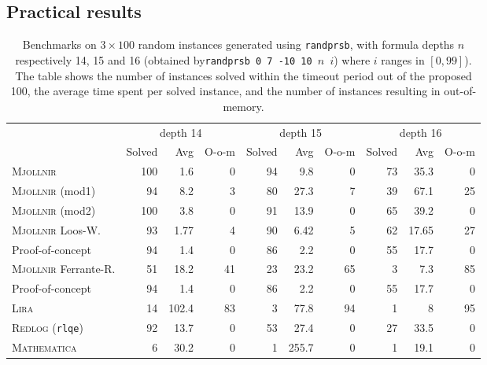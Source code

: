 \subsection{Practical results}
\label{part:benchmarks}

\begin{table}[htb]
\begin{center}
\tableaularge
\begin{tabular}{|l|r|r|r|r|r|r|r|r|r|}
\hline
& \multicolumn{3}{|c}{depth 14}
& \multicolumn{3}{|c|}{depth 15}
& \multicolumn{3}{|c|}{depth 16}\\
& Solved & Avg & O-o-m
& Solved & Avg & O-o-m
& Solved & Avg & O-o-m\\
\hline
\textsc{Mjollnir} & 100 & 1.6 & 0 & 94 & 9.8 & 0 & 73 & 35.3 & 0\\
\textsc{Mjollnir} (mod1) & 94 & 8.2 & 3 & 80 & 27.3 & 7 & 39 & 67.1 & 25\\
\textsc{Mjollnir} (mod2) & 100 & 3.8 & 0 & 91 & 13.9 & 0 & 65 & 39.2 & 0\\
\textsc{Mjollnir} Loos-W. & 93 & 1.77 & 4 & 90 & 6.42 & 5 & 62 & 17.65 & 27\\
Proof-of-concept & 94 & 1.4 & 0 & 86 & 2.2 & 0 & 55 & 17.7 & 0\\
\textsc{Mjollnir} Ferrante-R. & 51 & 18.2 & 41 & 23 & 23.2 & 65 & 3 & 7.3 & 85\\
Proof-of-concept & 94 & 1.4 & 0 & 86 & 2.2 & 0 & 55 & 17.7 & 0\\
\textsc{Lira} & 14 & 102.4 & 83 & 3 & 77.8 & 94 & 1 & 8 & 95\\
\textsc{Redlog} (\texttt{rlqe}) & 92 & 13.7 & 0 & 53 & 27.4 & 0 & 27 & 33.5 & 0\\
\textsc{Mathematica} & 6 & 30.2 & 0 & 1 & 255.7 & 0 & 1 & 19.1 & 0\\
\hline
\end{tabular}
\end{center}
\caption{Benchmarks on $3\times 100$ random instances generated using \texttt{randprsb}, with formula depths $n$ respectively 14, 15 and 16 (obtained by\texttt{randprsb 0 7 -10 10 $n$ $i$}) where $i$ ranges in $[0,99]$). The table shows the number of instances solved within the timeout period out of the proposed 100, the average time spent per solved instance, and the number of instances resulting in out-of-memory.}
\label{tab:benchmarks2}
\end{table}

